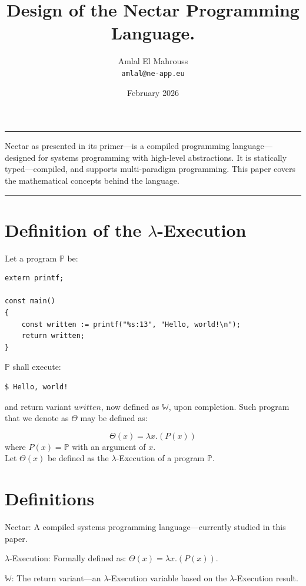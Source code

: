 \documentclass[11pt, a4paper]{article}
\title{Design of the Nectar Programming Language.}
\author{Amlal El Mahrouss\\\texttt{amlal@ne-app.eu}}
\date{February 2026}
\begin{document}
\bf \maketitle

\begin{center}
	\rule[0.01cm]{17cm}{0.01cm}
\end{center}

\abstract
{
	Nectar as presented in its primer—is a compiled programming language—designed for systems programming with high-level abstractions.
	It is statically typed—compiled, and supports multi-paradigm programming. This paper covers the mathematical concepts behind the language.
}

\begin{center}
	\rule[1cm]{17cm}{0.01cm}
\end{center}

\section{Definition of the $\lambda$-Execution}

Let a program $\mathbb{P}$ be:

\begin{lstlisting}
extern printf;

const main()
{
    const written := printf("%s:13", "Hello, world!\n");
    return written;
}
\end{lstlisting} 
$\mathbb{P}$ shall execute:

\begin{lstlisting}
$ Hello, world!
\end{lstlisting}
and return variant $written$, now defined as $\mathbb{W}$, upon completion. Such program that we denote as $\Theta$ may be defined as:

\begin{equation}
	\Theta(x) = \lambda x.(P(x))
\end{equation}
where $P(x) = \mathbb{P}$ with an argument of $x$. \\ Let $\Theta(x)$ be defined as the $\lambda$-Execution of a program $\mathbb{P}$.

\section{Definitions}

	\item Nectar: A compiled systems programming language—currently studied in this paper.
	\item $\lambda$-Execution: Formally defined as: $\Theta(x) = \lambda x.(P(x))$.
	\item $\mathbb{W}$: The return variant—an $\lambda$-Execution variable based on the $\lambda$-Execution result.
\end{document}
